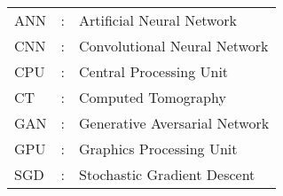 \begin{tabular}{lcl}
ANN                 &:     & Artificial Neural Network \\
CNN                 &:     & Convolutional Neural Network \\
CPU                 &:     & Central Processing Unit \\
CT                  &:     & Computed Tomography \\
GAN                 &:     & Generative Aversarial Network \\
GPU                 &:     & Graphics Processing Unit \\
SGD                 &:     & Stochastic Gradient Descent \\
\end{tabular}